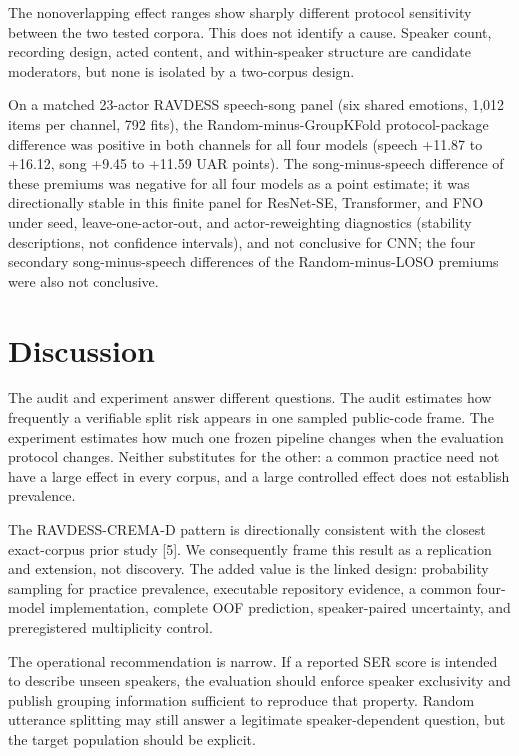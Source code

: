 \documentclass{article}
\begin{document}
The nonoverlapping effect ranges show sharply different protocol sensitivity between the two tested corpora.
This does not identify a cause.
Speaker count, recording design, acted content, and within-speaker structure are candidate moderators, but none is isolated by a two-corpus design.

On a matched 23-actor RAVDESS speech-song panel (six shared emotions, 1,012 items per channel, 792 fits), the Random-minus-GroupKFold protocol-package difference was positive in both channels for all four models (speech +11.87 to +16.12, song +9.45 to +11.59 UAR points).
The song-minus-speech difference of these premiums was negative for all four models as a point estimate; it was directionally stable in this finite panel for ResNet-SE, Transformer, and FNO under seed, leave-one-actor-out, and actor-reweighting diagnostics (stability descriptions, not confidence intervals), and not conclusive for CNN; the four secondary song-minus-speech differences of the Random-minus-LOSO premiums were also not conclusive.

\section{Discussion}

The audit and experiment answer different questions.
The audit estimates how frequently a verifiable split risk appears in one sampled public-code frame.
The experiment estimates how much one frozen pipeline changes when the evaluation protocol changes.
Neither substitutes for the other: a common practice need not have a large effect in every corpus, and a large controlled effect does not establish prevalence.

The RAVDESS-CREMA-D pattern is directionally consistent with the closest exact-corpus prior study [5].
We consequently frame this result as a replication and extension, not discovery.
The added value is the linked design: probability sampling for practice prevalence, executable repository evidence, a common four-model implementation, complete OOF prediction, speaker-paired uncertainty, and preregistered multiplicity control.

The operational recommendation is narrow.
If a reported SER score is intended to describe unseen speakers, the evaluation should enforce speaker exclusivity and publish grouping information sufficient to reproduce that property.
Random utterance splitting may still answer a legitimate speaker-dependent question, but the target population should be explicit.
\end{document}
